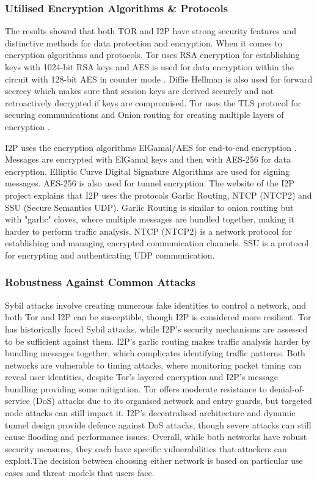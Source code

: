 \documentclass[12pt,conference]{IEEEtran}
\begin{document}
\subsubsection{Utilised Encryption Algorithms \& Protocols}
The results showed that both TOR and I2P have strong security features and distinctive methods for data protection and encryption. When it comes to encryption algorithms and protocols. Tor uses RSA encryption for establishing keys with 1024-bit RSA keys and AES is used for data encryption within the circuit with 128-bit AES in counter mode \cite{torSpecifications}. Diffie Hellman is also used for forward secrecy which makes sure that session keys are derived securely and not retroactively decrypted if keys are compromised. Tor uses the TLS protocol for securing communications and Onion routing for creating multiple layers of encryption \cite{aComparativeStudyOnAnonymizingNetworks}.

I2P uses the encryption algorithms ElGamal/AES for end-to-end encryption \cite{convenientDetectionMethodForAnonymousNetworks}. Messages are encrypted with ElGamal keys and then with AES-256 for data encryption. Elliptic Curve Digital Signature Algorithms are used for signing messages. AES-256 is also used for tunnel encryption. The website of the I2P project \cite{i2pIntro} explains that I2P uses the protocols Garlic Routing, NTCP (NTCP2) and SSU (Secure Semantics UDP). Garlic Routing is similar to onion routing but with "garlic" cloves, where multiple messages are bundled together, making it harder to perform traffic analysis. NTCP (NTCP2) is a network protocol for establishing and managing encrypted communication channels. SSU is a protocol for encrypting and authenticating UDP communication.
\subsubsection{Robustness Against Common Attacks}
Sybil attacks involve creating numerous fake identities to control a network, and both Tor and I2P can be susceptible, though I2P is considered more resilient. Tor has historically faced Sybil attacks, while I2P's security mechanisms are assessed to be sufficient against them. I2P's garlic routing makes traffic analysis harder by bundling messages together, which complicates identifying traffic patterns. Both networks are vulnerable to timing attacks, where monitoring packet timing can reveal user identities, despite Tor's layered encryption and I2P's message bundling providing some mitigation. Tor offers moderate resistance to denial-of-service (DoS) attacks due to its organised network and entry guards, but targeted node attacks can still impact it. I2P's decentralised architecture and dynamic tunnel design provide defence against DoS attacks, though severe attacks can still cause flooding and performance issues. Overall, while both networks have robust security measures, they each have specific vulnerabilities that attackers can exploit.The decision between choosing either network is based on particular use cases and threat models that users face.
\end{document}

